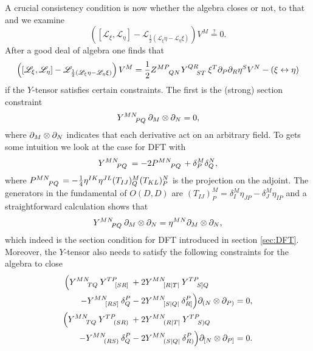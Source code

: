A crucial consistency condition is now whether the algebra closes or not, to that and we examine 
\begin{equation}\label{eq:closure}
    \left(\left[\mathscr{L}_\xi,\mathscr{L}_\eta\right]-\mathscr{L}_{\frac{1}{2}\left(\mathscr{L}_\xi\eta-\mathscr{L}_\eta\xi\right)}\right)V^M\overset{?}{=}0.
\end{equation}
After a good deal of algebra one finds that 
\begin{equation}
    \left(\left[\mathscr{L}_\xi,\mathscr{L}_\eta\right]-\mathscr{L}_{\frac{1}{2}\left(\mathscr{L}_\xi\eta-\mathscr{L}_\eta\xi\right)}\right)V^M = \frac{1}{2}\tensor{Z}{^{MP}_{QN}}\tensor{Y}{^{QR}_{ST}}\xi^T\pd_P\pd_R\eta^SV^N-\left(\xi\leftrightarrow\eta\right)
\end{equation}
if the $Y$-tensor satisfies certain constraints. The first is the (strong) section constraint 
\begin{equation}
    \tensor{Y}{^{MN}_{PQ}}\pd_M\otimes\pd_N = 0,
\end{equation}
where $\partial_M\otimes\partial_N$ indicates that each derivative act on an arbitrary field. To gets some intuition we look at the case for DFT with
\begin{equation}
    \tensor{Y}{^{MN}_{PQ}}=-2\tensor{P}{^{MN}_{PQ}}+\delta^M_P\delta^N_Q,
\end{equation}
where $\tensor{P}{^{MN}_{PQ}}=-\frac{1}{4}\eta^{IK}\eta^{JL}(T_{IJ})^M_Q(T_{KL})^N_P$ is the projection on the adjoint. The generators in the fundamental of $O(D,D)$ \cite{Berman2014} are $(T_{IJ})^M_P=\delta^M_I\eta_{JP}-\delta_J^M\eta_{IP}$ and a straightforward calculation shows that 
\begin{equation}\label{eq:section}
    \tensor{Y}{^{MN}_{PQ}}\pd_M\otimes\pd_N = \eta^{MN}\pd_M\otimes\pd_N,
\end{equation}
which indeed is the section condition for DFT introduced in section \ref{sec:DFT}. Moreover, the $Y$-tensor also needs to satisfy the following constraints for the algebra to close
\begin{subequations}
    \begin{align}
        \begin{split}
        \Big(\tensor{Y}{^{MN}_{TQ}}\tensor{Y}{^{TP}_{[SR]}}&+2\tensor{Y}{^{MN}_{[R|T|}}\tensor{Y}{^{TP}_{S]Q}}\\
        -\tensor{Y}{^{MN}_{[RS]}}\delta^P_Q&-2\tensor{Y}{^{MN}_{[S|Q|}}\delta_{R]}^P\Big)\pd_{(N}\otimes\pd_{P)}=0,
        \end{split}\label{eq:closure1}
        \\
        \begin{split}
        \Big(\tensor{Y}{^{MN}_{TQ}}\tensor{Y}{^{TP}_{(SR)}}&+2\tensor{Y}{^{MN}_{(R|T|}}\tensor{Y}{^{TP}_{S)Q}}\\
        -\tensor{Y}{^{MN}_{(RS)}}\delta^P_Q&-2\tensor{Y}{^{MN}_{(S|Q|}}\delta_{R)}^P\Big)\pd_{[N}\otimes\pd_{P]}=0.
        \end{split}\label{eq:closure2}
    \end{align}
    \end{subequations}

